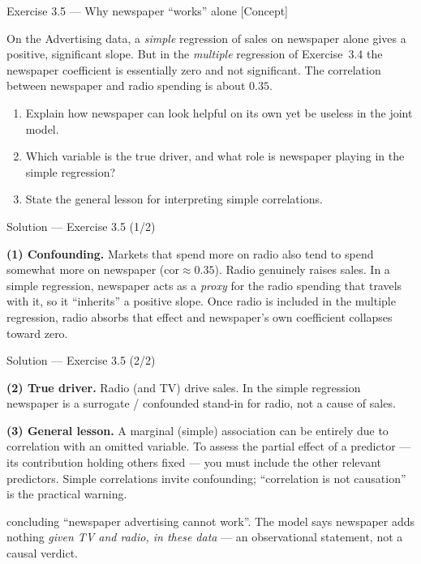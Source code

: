 \documentclass[aspectratio=169,11pt]{beamer}
\begin{document}
\begin{frame}{Exercise 3.5 --- Why newspaper ``works'' alone [Concept]}
  \begin{exercise}
    On the Advertising data, a \emph{simple} regression of sales on
    newspaper alone gives a positive, significant slope. But in the
    \emph{multiple} regression of Exercise~3.4 the newspaper
    coefficient is essentially zero and not significant. The correlation
    between newspaper and radio spending is about $0.35$.
    \begin{enumerate}
      \item Explain how newspaper can look helpful on its own yet be
            useless in the joint model.
      \item Which variable is the true driver, and what role is
            newspaper playing in the simple regression?
      \item State the general lesson for interpreting simple
            correlations.
    \end{enumerate}
  \end{exercise}
\end{frame}

\begin{frame}{Solution --- Exercise 3.5 (1/2)}
  \begin{solutionbox}
    \textbf{(1) Confounding.} Markets that spend more on radio also tend
    to spend somewhat more on newspaper ($\mathrm{cor}\approx 0.35$).
    Radio genuinely raises sales. In a simple regression, newspaper acts
    as a \emph{proxy} for the radio spending that travels with it, so it
    ``inherits'' a positive slope. Once radio is included in the multiple
    regression, radio absorbs that effect and newspaper's own
    coefficient collapses toward zero.
  \end{solutionbox}
\end{frame}

\begin{frame}{Solution --- Exercise 3.5 (2/2)}
  \begin{solutionbox}
    \textbf{(2) True driver.} Radio (and TV) drive sales. In the simple
    regression newspaper is a surrogate / confounded stand-in for radio,
    not a cause of sales.

    \textbf{(3) General lesson.} A marginal (simple) association can be
    entirely due to correlation with an omitted variable. To assess the
    partial effect of a predictor --- its contribution holding others
    fixed --- you must include the other relevant predictors. Simple
    correlations invite confounding; ``correlation is not causation'' is
    the practical warning.
  \end{solutionbox}
  \begin{mistake}
    concluding ``newspaper advertising cannot
    work''. The model says newspaper adds nothing \emph{given TV and
    radio, in these data} --- an observational statement, not a causal
    verdict.
  \end{mistake}
\end{frame}
\end{document}
